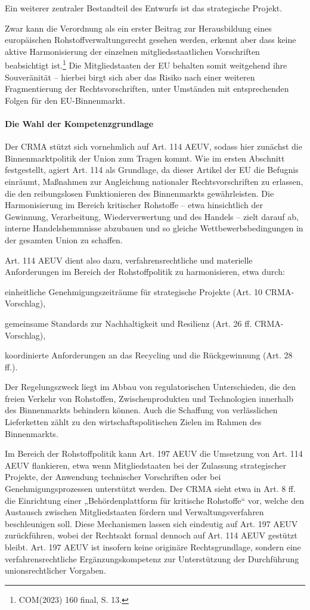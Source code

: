 \documentclass[12pt,a4paper,oneside]{book} %
\begin{document}
	Ein weiterer zentraler Bestandteil des Entwurfs ist das \glqq strategische Projekt\grqq. %
	
	Zwar kann die Verordnung als ein erster Beitrag zur Herausbildung eines europäischen Rohstoffverwaltungsrecht gesehen werden, erkennt aber dass keine aktive Harmonisierung der einzelnen mitgliedsstaatlichen Vorschriften beabsichtigt ist.\footnote{COM(2023) 160 final, S. 13.} Die Mitgliedstaaten der EU behalten somit weitgehend ihre Souveränität -- hierbei birgt sich aber das Risiko nach einer weiteren Fragmentierung der Rechtsvorschriften, unter Umständen mit entsprechenden Folgen für den EU-Binnenmarkt.
	
	\paragraph{Die Wahl der Kompetenzgrundlage}
	Der CRMA stützt sich vornehmlich auf Art. 114 AEUV, sodass hier zunächst die Binnenmarktpolitik der Union zum Tragen kommt. Wie im ersten Abschnitt festgestellt, agiert Art. 114 als Grundlage, da dieser Artikel der EU die Befugnis einräumt, Maßnahmen zur Angleichung nationaler Rechtsvorschriften zu erlassen, die den reibungslosen Funktionieren des Binnenmarkts gewährleisten. Die Harmonisierung im Bereich kritischer Rohstoffe – etwa hinsichtlich der Gewinnung, Verarbeitung, Wiederverwertung und des Handels – zielt darauf ab, interne Handelshemmnisse abzubauen und so gleiche Wettbewerbsbedingungen in der gesamten Union zu schaffen.
	
	Art. 114 AEUV dient also dazu, verfahrensrechtliche und materielle Anforderungen im Bereich der Rohstoffpolitik zu harmonisieren, etwa durch:
	
	einheitliche Genehmigungszeiträume für strategische Projekte (Art. 10 CRMA-Vorschlag),
	
	gemeinsame Standards zur Nachhaltigkeit und Resilienz (Art. 26 ff. CRMA-Vorschlag),
	
	koordinierte Anforderungen an das Recycling und die Rückgewinnung (Art. 28 ff.).
	
	Der Regelungszweck liegt im Abbau von regulatorischen Unterschieden, die den freien Verkehr von Rohstoffen, Zwischenprodukten und Technologien innerhalb des Binnenmarkts behindern können. Auch die Schaffung von verlässlichen Lieferketten zählt zu den wirtschaftspolitischen Zielen im Rahmen des Binnenmarkts.
	
	Im Bereich der Rohstoffpolitik kann Art. 197 AEUV die Umsetzung von Art. 114 AEUV flankieren, etwa wenn Mitgliedstaaten bei der Zulassung strategischer Projekte, der Anwendung technischer Vorschriften oder bei Genehmigungsprozessen unterstützt werden. Der CRMA sieht etwa in Art. 8 ff. die Einrichtung einer „Behördenplattform für kritische Rohstoffe“ vor, welche den Austausch zwischen Mitgliedstaaten fördern und Verwaltungsverfahren beschleunigen soll.
	Diese Mechanismen lassen sich eindeutig auf Art. 197 AEUV zurückführen, wobei der Rechtsakt formal dennoch auf Art. 114 AEUV gestützt bleibt. Art. 197 AEUV ist insofern keine originäre Rechtsgrundlage, sondern eine verfahrensrechtliche Ergänzungskompetenz zur Unterstützung der Durchführung unionsrechtlicher Vorgaben.
	
\end{document}
